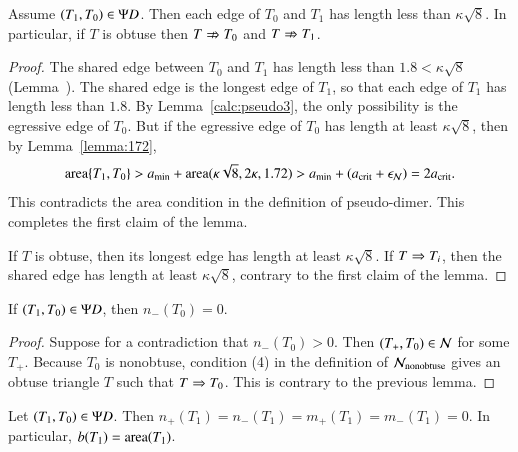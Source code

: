 \begin{lemma}
  Assume $(T_1,T_0)\in\Psi D$.  Then each edge of $T_0$ and $T_1$ has
  length less than $\kappa\sqrt8$.  In particular, if $T$ is obtuse
  then $T\nRightarrow T_0$ and $T \nRightarrow T_1$.
\end{lemma}

\begin{proof} 
  The shared edge between $T_0$ and $T_1$ has length less than $1.8 <
  \kappa\sqrt8$ (Lemma~).  The shared edge is the
  longest edge of $T_1$, so that each edge of $T_1$ has length less
  than $1.8$.  By Lemma~\ref{calc:pseudo3}, the only possibility is the egressive edge of $T_0$.
  But if the egressive edge of $T_0$ has length at least
  $\kappa\sqrt8$, then by Lemma~\ref{lemma:172},
\[
{\operatorname{area}}\{T_1,T_0\} > a_\text{min} + {\operatorname{area}}(\kappa\sqrt8,2\kappa,1.72) 
> a_\text{min} + (a_\text{crit} + \epsilon_{\mathcal N}) = 2a_\text{crit}.
\]
This contradicts the area condition in the definition of pseudo-dimer.
This completes the first claim of the lemma.

If $T$ is obtuse, then its longest edge has length at least
$\kappa\sqrt8$.  If $T\Rightarrow T_i$, then the shared edge has length at
least $\kappa\sqrt8$, contrary to the first claim of the lemma.
\end{proof}

\begin{corollary}
If $(T_1,T_0)\in\Psi D$, then $n_-(T_0)=0$.
\end{corollary}

\begin{proof} 
  Suppose for a contradiction that $n_-(T_0)>0$.  Then $(T_+,T_0)\in
  \mathcal N$ for some $T_+$.  Because $T_0$ is nonobtuse,
  condition (4) in the definition of $\mathcal N_{\text{nonobtuse}}$
  gives an obtuse triangle $T$ such that $T\Rightarrow T_0$.  This is contrary to the
  previous lemma.
\end{proof}

\begin{lemma} 
  Let $(T_1,T_0)\in\Psi D$.  Then
  $n_+(T_1)=n_-(T_1)=m_+(T_1)=m_-(T_1)=0$.  In particular, $b(T_1) =
  {\operatorname{area}}(T_1)$.
\end{lemma}


